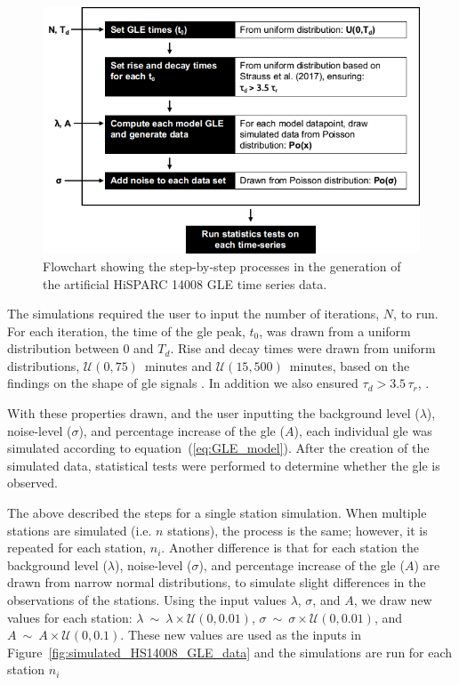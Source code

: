 \begin{figure}[ht!]
	\centering
	\includegraphics[width=0.9\columnwidth]{GLE_sims_flowchart.png}
	\caption{Flowchart showing the step-by-step processes in the generation of the artificial HiSPARC 14008 GLE time series data.}
	\label{fig:gle_flowchart}
\end{figure}

The simulations required the user to input the number of iterations, $N$, to run. For each iteration, the time of the \gls{gle} peak, $t_0$, was drawn from a uniform distribution between 0 and $T_d$. Rise and decay times were drawn from uniform distributions, $\mathcal{U}(0, 75)$~minutes and $\mathcal{U}(15, 500)$~minutes, based on the findings on the shape of \gls{gle} signals \citep{strauss_pulse_2017}. In addition we also ensured $\tau_d > 3.5 \, \tau_r$, \citep{strauss_pulse_2017}.

With these properties drawn, and the user inputting the background level ($\lambda$), noise-level ($\sigma$), and percentage increase of the \gls{gle} ($A$), each individual \gls{gle} was simulated according to equation~(\ref{eq:GLE_model}). After the creation of the simulated data, statistical tests were performed to determine whether the \gls{gle} is observed.

The above described the steps for a single station simulation. When multiple stations are simulated (i.e. $n$ stations), the process is the same; however, it is repeated for each station, $n_i$. Another difference is that for each station the background level ($\lambda$), noise-level ($\sigma$), and percentage increase of the \gls{gle} ($A$) are drawn from narrow normal distributions, to simulate slight differences in the observations of the stations. Using the input values $\lambda$, $\sigma$, and $A$, we draw new values for each station: $\lambda~\sim~\lambda\times\mathcal{U}(0, 0.01)$, $\sigma~\sim~\sigma\times\mathcal{U}(0, 0.01)$, and $A~\sim~A\times\mathcal{U}(0, 0.1)$. These new values are used as the inputs in Figure~\ref{fig:simulated_HS14008_GLE_data} and the simulations are run for each station $n_i$

%
%
%
